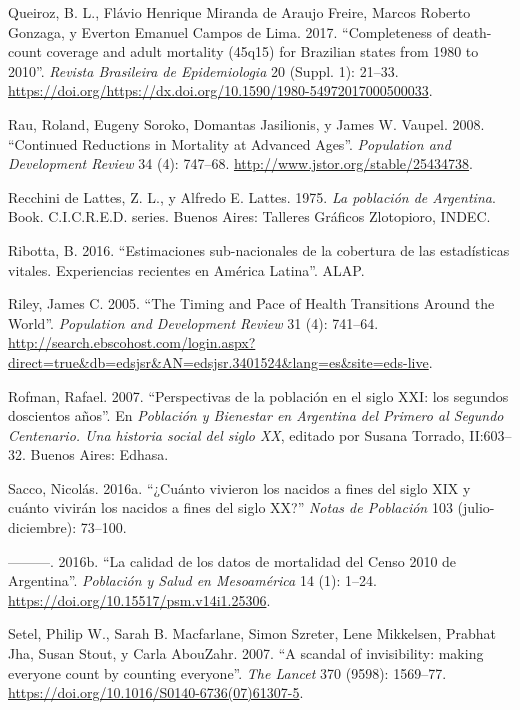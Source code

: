 \documentclass[12pt,spanish,]{article}
\begin{document}
\leavevmode\hypertarget{ref-QueirozFreireGonzagaEtAl2017}{}%
Queiroz, B. L., Flávio Henrique Miranda de Araujo Freire, Marcos Roberto
Gonzaga, y Everton Emanuel Campos de Lima. 2017. ``Completeness of
death-count coverage and adult mortality (45q15) for Brazilian states
from 1980 to 2010''. \emph{Revista Brasileira de Epidemiologia} 20
(Suppl. 1): 21--33.
\url{https://doi.org/https://dx.doi.org/10.1590/1980-54972017000500033}.

\leavevmode\hypertarget{ref-RauEtAl2008}{}%
Rau, Roland, Eugeny Soroko, Domantas Jasilionis, y James W. Vaupel.
2008. ``Continued Reductions in Mortality at Advanced Ages''.
\emph{Population and Development Review} 34 (4): 747--68.
\url{http://www.jstor.org/stable/25434738}.

\leavevmode\hypertarget{ref-RecchinideLattes1975}{}%
Recchini de Lattes, Z. L., y Alfredo E. Lattes. 1975. \emph{La población
de Argentina}. Book. C.I.C.R.E.D. series. Buenos Aires: Talleres
Gráficos Zlotopioro, INDEC.

\leavevmode\hypertarget{ref-Ribotta2016}{}%
Ribotta, B. 2016. ``Estimaciones sub-nacionales de la cobertura de las
estadísticas vitales. Experiencias recientes en América Latina''. ALAP.

\leavevmode\hypertarget{ref-Riley2005}{}%
Riley, James C. 2005. ``The Timing and Pace of Health Transitions Around
the World''. \emph{Population and Development Review} 31 (4): 741--64.
\url{http://search.ebscohost.com/login.aspx?direct=true\&db=edsjsr\&AN=edsjsr.3401524\&lang=es\&site=eds-live}.

\leavevmode\hypertarget{ref-Rofman2007}{}%
Rofman, Rafael. 2007. ``Perspectivas de la población en el siglo XXI:
los segundos doscientos años''. En \emph{Población y Bienestar en
Argentina del Primero al Segundo Centenario. Una historia social del
siglo XX}, editado por Susana Torrado, II:603--32. Buenos Aires: Edhasa.

\leavevmode\hypertarget{ref-Sacco2016}{}%
Sacco, Nicolás. 2016a. ``¿Cuánto vivieron los nacidos a fines del siglo
XIX y cuánto vivirán los nacidos a fines del siglo XX?'' \emph{Notas de
Población} 103 (julio-diciembre): 73--100.

\leavevmode\hypertarget{ref-Sacco2016a}{}%
---------. 2016b. ``La calidad de los datos de mortalidad del Censo 2010
de Argentina''. \emph{Población y Salud en Mesoamérica} 14 (1): 1--24.
\url{https://doi.org/10.15517/psm.v14i1.25306}.

\leavevmode\hypertarget{ref-SetelEtAl2007}{}%
Setel, Philip W., Sarah B. Macfarlane, Simon Szreter, Lene Mikkelsen,
Prabhat Jha, Susan Stout, y Carla AbouZahr. 2007. ``A scandal of
invisibility: making everyone count by counting everyone''. \emph{The
Lancet} 370 (9598): 1569--77.
\url{https://doi.org/10.1016/S0140-6736(07)61307-5}.
\end{document}

